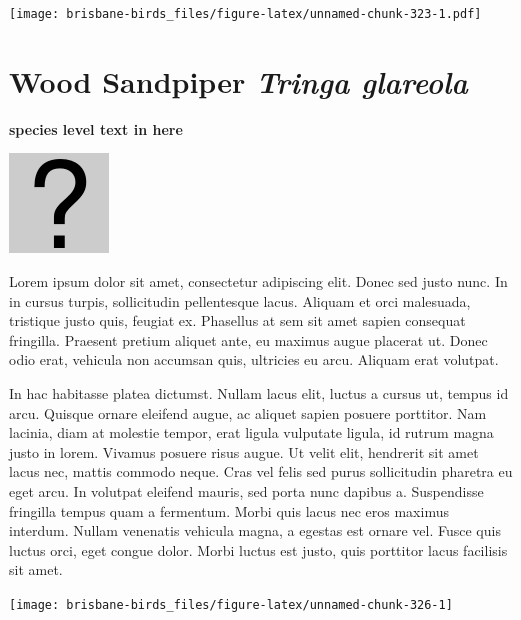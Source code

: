 \documentclass[]{book}
\let\origfigure\figure
\let\endorigfigure\endfigure
\renewenvironment{figure}[1][2] {
  \expandafter\origfigure\expandafter[H]
} {
  \endorigfigure
}
\begin{document}
\begin{figure}
\centering
\texttt{[image: brisbane-birds\_files/figure-latex/unnamed-chunk-323-1.pdf]}
\caption{\label{fig:unnamed-chunk-323}insert figure caption}
\end{figure}

\section{\texorpdfstring{Wood Sandpiper \emph{Tringa
glareola}}{Wood Sandpiper Tringa glareola}}\label{wood-sandpiper-tringa-glareola}

\textbf{species level text in here}

\begin{figure}
\centering
\includegraphics{assets/missing.png}
\caption{No image for species}
\end{figure}

Lorem ipsum dolor sit amet, consectetur adipiscing elit. Donec sed justo
nunc. In in cursus turpis, sollicitudin pellentesque lacus. Aliquam et
orci malesuada, tristique justo quis, feugiat ex. Phasellus at sem sit
amet sapien consequat fringilla. Praesent pretium aliquet ante, eu
maximus augue placerat ut. Donec odio erat, vehicula non accumsan quis,
ultricies eu arcu. Aliquam erat volutpat.

In hac habitasse platea dictumst. Nullam lacus elit, luctus a cursus ut,
tempus id arcu. Quisque ornare eleifend augue, ac aliquet sapien posuere
porttitor. Nam lacinia, diam at molestie tempor, erat ligula vulputate
ligula, id rutrum magna justo in lorem. Vivamus posuere risus augue. Ut
velit elit, hendrerit sit amet lacus nec, mattis commodo neque. Cras vel
felis sed purus sollicitudin pharetra eu eget arcu. In volutpat eleifend
mauris, sed porta nunc dapibus a. Suspendisse fringilla tempus quam a
fermentum. Morbi quis lacus nec eros maximus interdum. Nullam venenatis
vehicula magna, a egestas est ornare vel. Fusce quis luctus orci, eget
congue dolor. Morbi luctus est justo, quis porttitor lacus facilisis sit
amet.

\begin{figure}
\texttt{[image: brisbane-birds\_files/figure-latex/unnamed-chunk-326-1]} \caption{insert figure caption}\label{fig:unnamed-chunk-326}
\end{figure}
\end{document}
